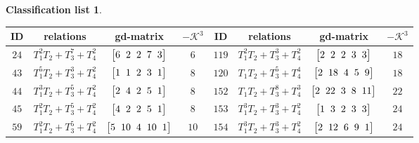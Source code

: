 \documentclass[pdftex]{sigma}%
\theoremstyle{definition}
\newtheorem{class-list}[thm]{Classification list}
\numberwithin{equation}{section}
\begin{document}
\begin{class-list}
\begin{table}[t!]\centering\setlength{\tabcolsep}{3.5pt}
\renewcommand{\arraystretch}{1.3}\small\tabulinesep=1mm
\begin{tabu}{c|c|c|c||c|c|c|c}
\hline
ID&relations&gd-matrix&$-\mathcal{K}^3$&ID&relations&gd-matrix&$-\mathcal{K}^3$
\\
\hline
${24}$&${T_{1}^{2}T_{2}+T_{3}^{7}+T_{4}^{2}}$
&$\arraycolsep=1mm\begin{bmatrix}{6} & {2} & {2} & {7} & {3}\end{bmatrix}$&${6}$
&${119}$&${T_{1}^{2}T_{2}+T_{3}^{3}+T_{4}^{2}}$
&$\arraycolsep=1mm\begin{bmatrix}{2} & {2} & {2} & {3} & {3}\end{bmatrix}$&${18}$
\\
\hline
${43}$&${T_{1}^{5}T_{2}+T_{3}^{3}+T_{4}^{2}}$
&$\arraycolsep=1mm\begin{bmatrix}{1} & {1} & {2} & {3} & {1}\end{bmatrix}$&${8}$
&${120}$&${T_{1}T_{2}+T_{3}^{5}+T_{4}^{4}}$
&$\arraycolsep=1mm\begin{bmatrix}{2} & {18} & {4} & {5} & {9}\end{bmatrix}$&${18}$
\\
\hline
${44}$&${T_{1}^{3}T_{2}+T_{3}^{5}+T_{4}^{2}}$
&$\arraycolsep=1mm\begin{bmatrix}{2} & {4} & {2} & {5} & {1}\end{bmatrix}$&${8}$
&${152}$&${T_{1}T_{2}+T_{3}^{8}+T_{4}^{3}}$
&$\arraycolsep=1mm\begin{bmatrix}{2} & {22} & {3} & {8} & {11}\end{bmatrix}$&${22}$
\\
\hline
${45}$&${T_{1}^{2}T_{2}+T_{3}^{5}+T_{4}^{2}}$
&$\arraycolsep=1mm\begin{bmatrix}{4} & {2} & {2} & {5} & {1}\end{bmatrix}$&${8}$
&${153}$&${T_{1}^{3}T_{2}+T_{3}^{3}+T_{4}^{2}}$
&$\arraycolsep=1mm\begin{bmatrix}{1} & {3} & {2} & {3} & {3}\end{bmatrix}$&${24}$
\\
\hline
${59}$&${T_{1}^{2}T_{2}+T_{3}^{5}+T_{4}^{2}}$
&$\arraycolsep=1mm\begin{bmatrix}{5} & {10} & {4} & {10} & {1}\end{bmatrix}$&${10}$
&${154}$&${T_{1}^{3}T_{2}+T_{3}^{3}+T_{4}^{2}}$
&$\arraycolsep=1mm\begin{bmatrix}{2} & {12} & {6} & {9} & {1}\end{bmatrix}$&${24}$

\end{tabu}
\end{table}
\end{class-list}
\end{document}
